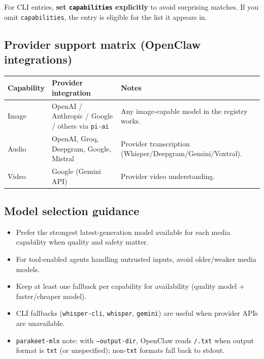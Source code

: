 For CLI entries, \textbf{set \texttt{capabilities} explicitly} to avoid surprising matches.
If you omit \texttt{capabilities}, the entry is eligible for the list it appears in.

\subsection{Provider support matrix (OpenClaw integrations)}



\begin{table}[h]
\centering
\small
\begin{tabular}{|l|l|l|}
\hline
Capability & Provider integration & Notes \\
\hline
Image & OpenAI / Anthropic / Google / others via \texttt{pi-ai} & Any image-capable model in the registry works. \\
\hline
Audio & OpenAI, Groq, Deepgram, Google, Mistral & Provider transcription (Whisper/Deepgram/Gemini/Voxtral). \\
\hline
Video & Google (Gemini API) & Provider video understanding. \\
\hline
\end{tabular}
\end{table}



\subsection{Model selection guidance}


\begin{itemize}
  \item Prefer the strongest latest-generation model available for each media capability when quality and safety matter.
  \item For tool-enabled agents handling untrusted inputs, avoid older/weaker media models.
  \item Keep at least one fallback per capability for availability (quality model + faster/cheaper model).
  \item CLI fallbacks (\texttt{whisper-cli}, \texttt{whisper}, \texttt{gemini}) are useful when provider APIs are unavailable.
  \item \texttt{parakeet-mlx} note: with \texttt{--output-dir}, OpenClaw reads \texttt{/.txt} when output format is \texttt{txt} (or unspecified); non-\texttt{txt} formats fall back to stdout.
\end{itemize}


